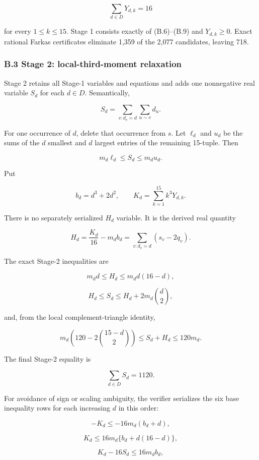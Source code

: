 \documentclass[
  english,
  11pt,
  a4paper,
]{article}
\begin{document}
\[
\sum_{d\in D}Y_{d,k}=16
\tag{B.9}
\]

for every \(1\le k\le15\). Stage 1 consists exactly of (B.6)--(B.9) and
\(Y_{d,k}\ge0\). Exact rational Farkas certificates eliminate 1,359 of
the 2,077 candidates, leaving 718.

\subsubsection{B.3 Stage 2: local-third-moment
relaxation}\label{b.3-stage-2-local-third-moment-relaxation}

Stage 2 retains all Stage-1 variables and equations and adds one
nonnegative real variable \(S_d\) for each \(d\in D\). Semantically,

\[
S_d=\sum_{v:d_v=d}\sum_{u\sim v}d_u.
\tag{B.10}
\]

For one occurrence of \(d\), delete that occurrence from \(s\). Let
\(\ell_d\) and \(u_d\) be the sums of the \(d\) smallest and \(d\)
largest entries of the remaining 15-tuple. Then

\[
m_d\ell_d\le S_d\le m_du_d.
\tag{B.11}
\]

Put

\[
b_d=d^3+2d^2,\qquad
K_d=\sum_{k=1}^{15}k^3Y_{d,k}.
\tag{B.12}
\]

There is no separately serialized \(H_d\) variable. It is the derived
real quantity

\[
H_d=\frac{K_d}{16}-m_db_d
=\sum_{v:d_v=d}(s_v-2q_v).
\tag{B.13}
\]

The exact Stage-2 inequalities are

\[
m_dd\le H_d\le m_dd(16-d),
\tag{B.14}
\]

\[
H_d\le S_d\le H_d+2m_d\binom d2,
\tag{B.15}
\]

and, from the local complement-triangle identity,

\[
m_d\left(120-2\binom{15-d}{2}\right)
\le S_d+H_d\le120m_d.
\tag{B.16}
\]

The final Stage-2 equality is

\[
\sum_{d\in D}S_d=1120.
\tag{B.17}
\]

For avoidance of sign or scaling ambiguity, the verifier serializes the
six base inequality rows for each increasing \(d\) in this order:

\[
-K_d\le-16m_d(b_d+d),
\tag{B.18}
\]

\[
K_d\le16m_d\{b_d+d(16-d)\},
\tag{B.19}
\]

\[
K_d-16S_d\le16m_db_d,
\tag{B.20}
\]
\end{document}
